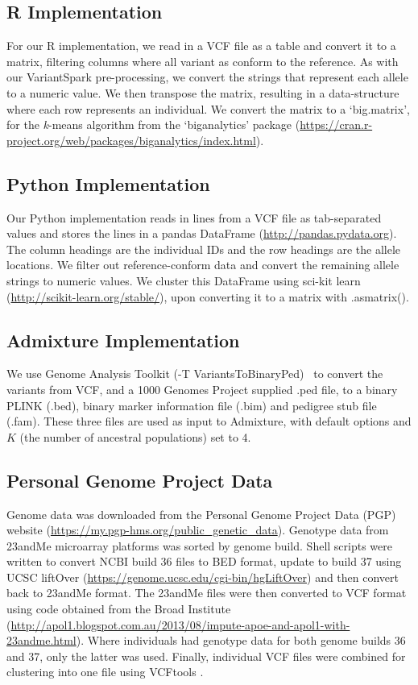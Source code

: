 \documentclass{bmcart}
\newcommand{\variantSpark}{{\sc VariantSpark}}
\newcommand{\kMeans}{\textit{k}-means}
\begin{document}
\subsection*{R Implementation}
For our R implementation, we read in a VCF file as a table and convert it to a matrix, filtering columns where all variant as conform to the reference. As with our \variantSpark{} pre-processing, we convert the strings that represent each allele to a numeric value.
We then transpose the matrix, resulting in a data-structure where each row represents an individual. We convert the matrix to a `big.matrix', for the \kMeans{} algorithm from the `biganalytics' package (\url{https://cran.r-project.org/web/packages/biganalytics/index.html}). 

\subsection*{Python Implementation}
Our Python implementation reads in lines from a VCF file as tab-separated values and stores the lines in a pandas DataFrame (\url{http://pandas.pydata.org}). The column headings are the individual IDs and the row headings are the allele locations.
We filter out reference-conform data and convert the remaining allele strings to numeric values. 
We cluster this DataFrame using sci-kit learn (\url{http://scikit-learn.org/stable/}), upon converting it to a matrix with {\sc .as\textunderscore{}matrix()}.

\subsection*{{\sc Admixture} Implementation}
We use Genome Analysis Toolkit ({\sc -T VariantsToBinaryPed})~\cite{McKenna2010} to convert the variants from VCF, and a 1000 Genomes Project supplied .ped file, to a binary PLINK (.bed), binary marker information file (.bim) and pedigree stub file (.fam).
These three files are used as input to {\sc Admixture}, with default options and $K$ (the number of ancestral populations) set to 4.

\subsection*{Personal Genome Project Data}
Genome data was downloaded from the Personal Genome Project Data (PGP) website (\url{https://my.pgp-hms.org/public_genetic_data}). Genotype data from 23andMe microarray platforms was sorted by genome 
build. Shell scripts were written to convert NCBI build 36 files to BED format, update to build 37 using UCSC liftOver (\url{https://genome.ucsc.edu/cgi-bin/hgLiftOver}) and 
then convert back to 23andMe format. The 23andMe files were then converted to VCF format using code obtained from the Broad Institute (\url{http://apol1.blogspot.com.au/2013/08/impute-apoe-and-apol1-with-23andme.html}). 
Where individuals had genotype data for both genome builds 36 and 37, only the latter was used. Finally, individual VCF files were combined for clustering into one 
file using VCFtools \cite{Danecek2011Variant}.
\end{document}
